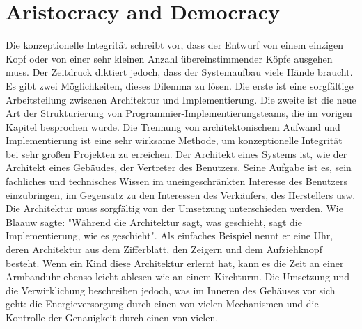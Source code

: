 \documentclass[a4paper, ngerman, 12pt, usenames, dvipsnames]{article}
\begin{document}
\section{Aristocracy and Democracy}
Die konzeptionelle Integrität schreibt vor, dass der Entwurf von einem einzigen Kopf oder von einer sehr kleinen Anzahl übereinstimmender Köpfe ausgehen muss.
Der Zeitdruck diktiert jedoch, dass der Systemaufbau viele Hände braucht. Es gibt zwei Möglichkeiten, dieses Dilemma zu lösen. Die erste ist eine sorgfältige Arbeitsteilung zwischen Architektur und Implementierung. Die zweite ist die neue Art der Strukturierung von Programmier-Implementierungsteams, die im vorigen Kapitel besprochen wurde.
Die Trennung von architektonischem Aufwand und Implementierung ist eine sehr wirksame Methode, um konzeptionelle Integrität bei sehr großen Projekten zu erreichen.
Der Architekt eines Systems ist, wie der Architekt eines Gebäudes, der Vertreter des Benutzers. Seine Aufgabe ist es, sein fachliches und technisches Wissen im uneingeschränkten Interesse des Benutzers einzubringen, im Gegensatz zu den Interessen des Verkäufers, des Herstellers usw. Die Architektur muss sorgfältig von der Umsetzung unterschieden werden. Wie Blaauw sagte: "Während die Architektur sagt, was geschieht, sagt die Implementierung, wie es geschieht". Als einfaches Beispiel nennt er eine Uhr, deren Architektur aus dem Zifferblatt, den Zeigern und dem Aufziehknopf besteht. Wenn ein Kind diese Architektur erlernt hat, kann es die Zeit an einer Armbanduhr ebenso leicht ablesen wie an einem Kirchturm. Die Umsetzung und die Verwirklichung beschreiben jedoch, was im Inneren des Gehäuses vor sich geht: die Energieversorgung durch einen von vielen Mechanismen und die Kontrolle der Genauigkeit durch einen von vielen.
\end{document}
